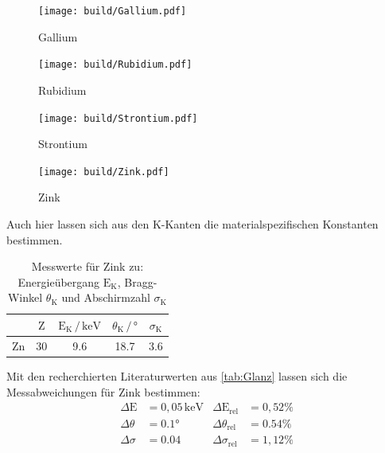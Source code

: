 \begin{figure}[H]
  \centering
  \texttt{[image: build/Gallium.pdf]}
  \caption{Gallium}
  \label{fig:Gallium}
\end{figure}

\begin{figure}[H]
  \centering
  \texttt{[image: build/Rubidium.pdf]}
  \caption{Rubidium}
  \label{fig:Rubidium}
\end{figure}

\begin{figure}[H]
  \centering
  \texttt{[image: build/Strontium.pdf]}
  \caption{Strontium}
  \label{fig:Strontium}
\end{figure}

\begin{figure}[H]
  \centering
  \texttt{[image: build/Zink.pdf]}
  \caption{Zink}
  \label{fig:Zink}
\end{figure}
Auch hier lassen sich aus den K-Kanten die materialspezifischen Konstanten bestimmen.
\begin{table}[H]
  \centering
  \caption{Messwerte für Zink zu: Energieübergang $\text{E}_\text{K}$, Bragg-Winkel $\theta_\text{K}$ und Abschirmzahl $\sigma_\text{K}$}
  \label{tab:mess}
  \begin{tabular}{c c c c c}
  \toprule
       & $\text{Z}$ & $\text{E}_\text{K} \,/\, \mathrm{keV}$ & $\theta_\text{K} \,/\, ° $ & $\sigma_\text{K} $\\
  \midrule 
    Zn & 30 & 9.6  & 18.7 & 3.6 \\
  \bottomrule
  \end{tabular}
  \end{table}
\noindent
  Mit den recherchierten Literaturwerten aus \autoref{tab:Glanz} lassen sich die Messabweichungen für Zink bestimmen:
\begin{align*}
    \Delta\text{E}&=0,05 \, \mathrm{keV} & \Delta\text{E}_\text{rel}&=0,52\%\\
    \Delta\theta&=0.1° & \Delta\theta_\text{rel}&=0.54\%\\
    \Delta\sigma&=0.04 & \Delta\sigma_\text{rel}&=1,12\%
\end{align*}